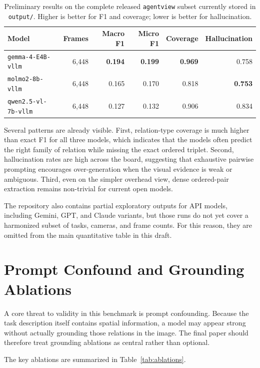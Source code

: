 \documentclass{article}
\begin{document}
\begin{table}[t]
    \caption{Preliminary results on the complete released \texttt{agentview} subset currently stored in \texttt{output/}. Higher is better for F1 and coverage; lower is better for hallucination.}
    \label{tab:prelim-results}
    \centering
    \begin{tabular}{lrrrrr}
        \toprule
        Model & Frames & Macro F1 & Micro F1 & Coverage & Hallucination \\
        \midrule
        \texttt{gemma-4-E4B-vllm} & 6,448 & \textbf{0.194} & \textbf{0.199} & \textbf{0.969} & 0.758 \\
        \texttt{molmo2-8b-vllm} & 6,448 & 0.165 & 0.170 & 0.818 & \textbf{0.753} \\
        \texttt{qwen2.5-vl-7b-vllm} & 6,448 & 0.127 & 0.132 & 0.906 & 0.834 \\
        \bottomrule
    \end{tabular}
\end{table}

Several patterns are already visible. First, relation-type coverage is much higher than exact F1 for all three models, which indicates that the models often predict the right family of relation while missing the exact ordered triplet. Second, hallucination rates are high across the board, suggesting that exhaustive pairwise prompting encourages over-generation when the visual evidence is weak or ambiguous. Third, even on the simpler overhead view, dense ordered-pair extraction remains non-trivial for current open models.

The repository also contains partial exploratory outputs for API models, including Gemini, GPT, and Claude variants, but those runs do not yet cover a harmonized subset of tasks, cameras, and frame counts. For this reason, they are omitted from the main quantitative table in this draft.

\section{Prompt Confound and Grounding Ablations}
A core threat to validity in this benchmark is prompt confounding. Because the task description itself contains spatial information, a model may appear strong without actually grounding those relations in the image. The final paper should therefore treat grounding ablations as central rather than optional.

The key ablations are summarized in Table~\ref{tab:ablations}.
\end{document}

